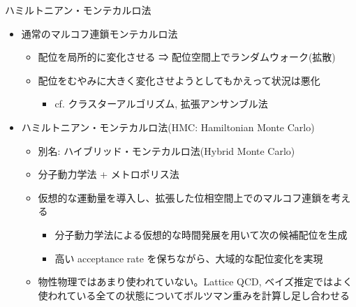 
\begin{frame}[t,fragile]{ハミルトニアン・モンテカルロ法}
  \begin{itemize}
  \item 通常のマルコフ連鎖モンテカルロ法
  \begin{itemize}
    \item 配位を局所的に変化させる ⇒ 配位空間上でランダムウォーク(拡散)
    \item 配位をむやみに大きく変化させようとしてもかえって状況は悪化
    \begin{itemize}
      \item cf. クラスターアルゴリズム, 拡張アンサンブル法
    \end{itemize}
  \end{itemize}

  \item ハミルトニアン・モンテカルロ法(HMC: Hamiltonian Monte Carlo)
  \begin{itemize}
    \item 別名: ハイブリッド・モンテカルロ法(Hybrid Monte Carlo)
    \item 分子動力学法 + メトロポリス法
    \item 仮想的な運動量を導入し、拡張した位相空間上でのマルコフ連鎖を考える
    \begin{itemize}
      \item 分子動力学法による仮想的な時間発展を用いて次の候補配位を生成
      \item 高い acceptance rate を保ちながら、大域的な配位変化を実現
    \end{itemize}
    \item 物性物理ではあまり使われていない。Lattice QCD, ベイズ推定ではよく使われている全ての状態についてボルツマン重みを計算し足し合わせる
    \end{itemize}
\end{itemize}
\end{frame}
